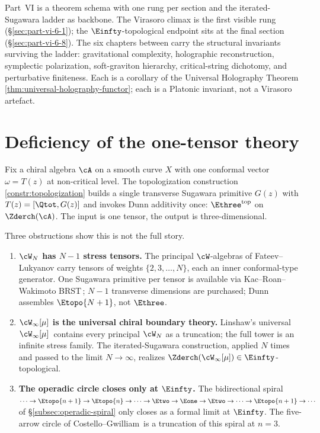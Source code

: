 \medskip

Part~VI is a theorem schema with one rung per section and
the iterated-Sugawara ladder as backbone. The Virasoro climax is
the first visible rung (\S\ref{sec:part-vi-6-1}); the
$\Einfty$-topological endpoint sits at the final section
(\S\ref{sec:part-vi-6-8}). The six chapters between carry the
structural invariants surviving the ladder: gravitational complexity,
holographic reconstruction, symplectic polarization, soft-graviton
hierarchy, critical-string dichotomy, and perturbative finiteness. Each
is a corollary of the Universal Holography
Theorem\,\ref{thm:universal-holography-functor}; each is a Platonic
invariant, not a Virasoro artefact.

\section{Deficiency of the one-tensor theory}
\label{sec:part-vi-deficiency}

Fix a chiral algebra $\cA$ on a smooth curve $X$ with one conformal
vector $\omega = T(z)$ at non-critical level. The topologization
construction\,\ref{constr:topologization} builds a single transverse
Sugawara primitive $G(z)$ with $T(z) = [\Qtot, G(z)]$ and invokes Dunn
additivity once: $\Ethree^{\mathrm{top}}$ on
$\Zderch(\cA)$. The input is one tensor, the output is three-dimensional.

Three obstructions show this is not the full story.

\begin{enumerate}
 \item \textbf{$\cW_N$ has $N-1$ stress tensors.} The principal
 $\cW$-algebras of Fateev--Lukyanov carry tensors of weights
 $\{2, 3, \ldots, N\}$, each an inner conformal-type generator. One
 Sugawara primitive per tensor is available via Kac--Roan--Wakimoto
 BRST\,\cite{KRW03}; $N-1$ transverse dimensions are purchased; Dunn
 assembles $\Etopo{N+1}$, not $\Ethree$.
 \item \textbf{$\cW_\infty[\mu]$ is the universal chiral boundary
 theory.} Linshaw's universal $\cW_\infty[\mu]$\,\cite{Linshaw-Winfty}
 contains every principal $\cW_N$ as a truncation; the full tower is an
 infinite stress family. The iterated-Sugawara construction, applied
 $N$ times and passed to the limit $N \to \infty$, realizes
 $\Zderch(\cW_\infty[\mu]) \in \Einfty$-topological.
 \item \textbf{The operadic circle closes only at
 $\Einfty$.} The bidirectional spiral
 $\cdots \to \Etopo{n+1} \to \Etopo{n} \to \cdots \to \Etwo \to \Eone
 \to \Etwo \to \cdots \to \Etopo{n+1} \to \cdots$
 of \S\ref{subsec:operadic-spiral} only closes as a formal limit at
 $\Einfty$. The five-arrow circle of
 Costello--Gwilliam\,\cite{CostelloGwilliam} is a truncation of this
 spiral at $n=3$.
\end{enumerate}

